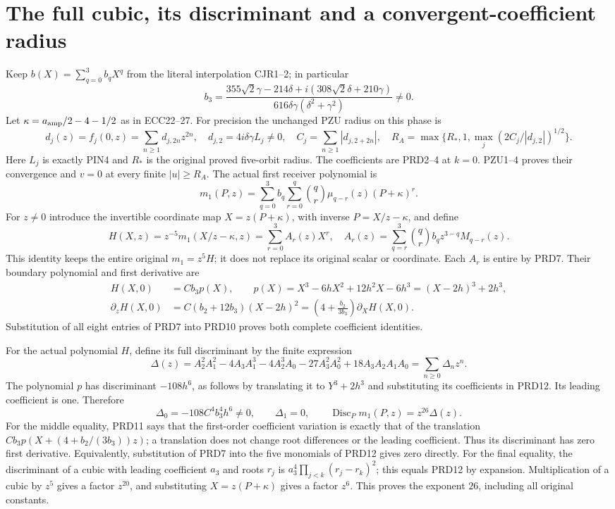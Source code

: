 \documentclass[11pt]{article}
\begin{document}
\section{The full cubic, its discriminant and a convergent-coefficient radius}
Keep $b(X)=\sum_{q=0}^3b_qX^q$ from the literal interpolation
CJR1--2; in particular
\[
 b_3=\frac{355\sqrt2\gamma-214\delta+
                   i(308\sqrt2\delta+210\gamma)}
                   {616\delta\gamma(\delta^2+\gamma^2)}\ne0.
 \tag{PRD8}
\]
Let $\kappa=a_{\rm amp}/2-4-1/2$ as in ECC22--27.
For precision the unchanged PZU radius on this phase is
\[
 d_j(z)=f_j(0,z)=\sum_{n\ge1}d_{j,2n}z^{2n},\quad
 d_{j,2}=4i\delta\gamma L_j\ne0,\quad
 C_j=\sum_{n\ge1}|d_{j,2+2n}|,\quad
 R_A=\max\{R_*,1,\max_j(2C_j/|d_{j,2}|)^{1/2}\}.
 \tag{PRD8a}
\]
Here $L_j$ is exactly PIN4 and $R_*$ is the original proved
five-orbit radius. The coefficients are PRD2--4 at $k=0$.
PZU1--4 proves their convergence and $v=0$ at every finite
$|u|\ge R_A$. The actual first receiver polynomial is
\[
 m_1(P,z)=\sum_{q=0}^3b_q\sum_{r=0}^q
          \binom qr\mu_{q-r}(z)(P+\kappa)^r.
 \tag{PRD9}
\]
For $z\ne0$ introduce the invertible coordinate map
$X=z(P+\kappa)$, with inverse $P=X/z-\kappa$, and define
\[
 H(X,z)=z^{-5}m_1(X/z-\kappa,z)=\sum_{r=0}^3A_r(z)X^r,
 \quad
 A_r(z)=\sum_{q=r}^3\binom qr b_qz^{3-q}M_{q-r}(z).
 \tag{PRD10}
\]
This identity keeps the entire original $m_1=z^5H$; it does
not replace its original scalar or coordinate. Each $A_r$ is
entire by PRD7. Their boundary polynomial and first derivative are
\[
\begin{split}
 H(X,0)&=Cb_3p(X),\qquad
 p(X)=X^3-6hX^2+12h^2X-6h^3=(X-2h)^3+2h^3,\\
 \partial_zH(X,0)&=C(b_2+12b_3)(X-2h)^2
       =\left(4+\frac{b_2}{3b_3}\right)\partial_XH(X,0).
\end{split}\tag{PRD11}
\]
Substitution of all eight entries of PRD7 into PRD10 proves
both complete coefficient identities.

For the actual polynomial $H$, define its full discriminant
by the finite expression
\[
 \Delta(z)=A_2^2A_1^2-4A_3A_1^3-4A_2^3A_0
                    -27A_3^2A_0^2+18A_3A_2A_1A_0
             =\sum_{n\ge0}\Delta_nz^n.
 \tag{PRD12}
\]
The polynomial $p$ has discriminant $-108h^6$, as follows
by translating it to $Y^3+2h^3$ and substituting its coefficients
in PRD12. Its leading coefficient is one. Therefore
\[
 \Delta_0=-108C^4b_3^4h^6\ne0,\qquad \Delta_1=0,
 \qquad
 \operatorname{Disc}_P m_1(P,z)=z^{26}\Delta(z).
 \tag{PRD13}
\]
For the middle equality, PRD11 says that the first-order
coefficient variation is exactly that of the translation
$Cb_3p(X+(4+b_2/(3b_3))z)$; a translation does not change
root differences or the leading coefficient. Thus its discriminant
has zero first derivative. Equivalently, substitution of PRD7
into the five monomials of PRD12 gives zero directly.
For the final equality, the discriminant of a cubic with leading
coefficient $a_3$ and roots $r_j$ is
$a_3^4\prod_{j<k}(r_j-r_k)^2$; this equals PRD12 by expansion.
Multiplication of a cubic by $z^5$ gives a factor $z^{20}$,
and substituting $X=z(P+\kappa)$ gives a factor $z^6$.
This proves the exponent $26$, including all original constants.
\end{document}
